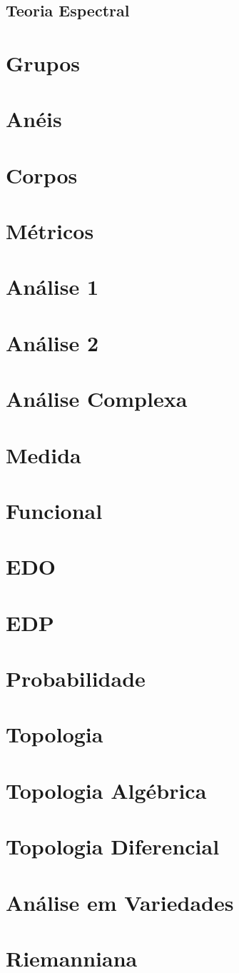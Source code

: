 \documentclass{article}
\begin{document}
\subsection{Teoria Espectral}

\section{Grupos}
\section{Anéis}
\section{Corpos}
\section{Métricos}
\section{Análise 1}
\section{Análise 2}
\section{Análise Complexa}
\section{Medida}
\section{Funcional}
\section{EDO}
\section{EDP}
\section{Probabilidade}
\section{Topologia}
\section{Topologia Algébrica}
\section{Topologia Diferencial}
\section{Análise em Variedades}
\section{Riemanniana}
\end{document}
